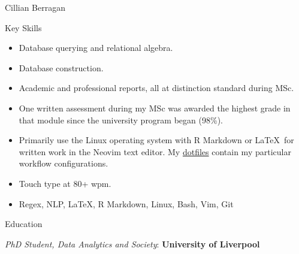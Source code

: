 \documentclass{scrartcl}
\begin{document}
\begin{cv}{Cillian Berragan}
\begin{cvlist}{Key Skills}
\begin{itemize}
\end{itemize}

\vspace{5mm}
\item[\textbf{SQL:}]\begin{itemize}\item Database querying and relational algebra.
\item Database construction.
\vspace{5mm}

\end{itemize}



\vspace{5mm}
\item[\textbf{Written work:}]\begin{itemize}\item Academic and professional reports, all at distinction standard during MSc.
\item One written assessment during my MSc was awarded the highest grade in that module since the university program began (98\%).
\item Primarily use the Linux operating system with R Markdown or \LaTeX\ for written work in the Neovim text editor. My \href{https://github.com/cjber/dotfiles}{dotfiles} contain my particular workflow configurations. 
\item Touch type at 80+ wpm.
\vspace{5mm}
\item[\textbf{Additional Skills}:] Regex, NLP, \LaTeX, R Markdown, Linux, Bash, Vim, Git

\end{itemize}
\end{cvlist}

\newpage
\begin{cvlist}{Education}

\item[2019 - present] \normalsize\textit{PhD Student, Data Analytics and Society}: \textbf{University of Liverpool}


\end{cvlist}
\end{cv}
\end{document}
